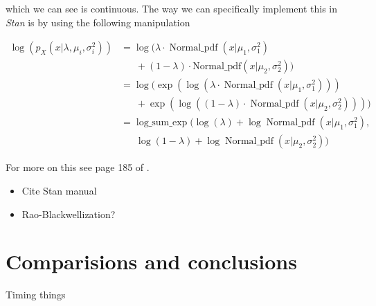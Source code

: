 \documentclass[11pt]{report}
\begin{document}
which we can see is continuous. The way we can specifically implement this in \emph{Stan} is by using the following manipulation

\begin{align}
\log(p_X(x | \lambda, \mu_i, \sigma^2_i)) &= \log(\lambda \cdot \operatorname{Normal\_pdf}(x | \mu_1, \sigma_1^2)  \nonumber \\
& \ \ \ \ \ \ \ + (1 - \lambda) \cdot \text{Normal\_pdf}(x | \mu_2, \sigma_2^2)) \\
&= \log(\exp(\log(\lambda \cdot \operatorname{Normal\_pdf}(x | \mu_1, \sigma_1^2)))  \nonumber \\
& \ \ \ \ \ \ \ + \exp(\log((1 - \lambda) \cdot \operatorname{Normal\_pdf}(x | \mu_2, \sigma_2^2)))) \\
&= \operatorname{log\_sum\_exp}(\log(\lambda) + \log\operatorname{Normal\_pdf}(x | \mu_1, \sigma_1^2),  \nonumber \\
& \ \ \ \ \ \ \ \log(1 - \lambda) + \log\operatorname{Normal\_pdf}(x | \mu_2, \sigma_2^2))
\end{align} 

For more on this see page 185 of \cite{stan}.

\begin{itemize}

\item Cite Stan manual

\item Rao-Blackwellization? 

\end{itemize}

\chapter{Comparisions and conclusions}

Timing things

\printbibliography
\end{document}
